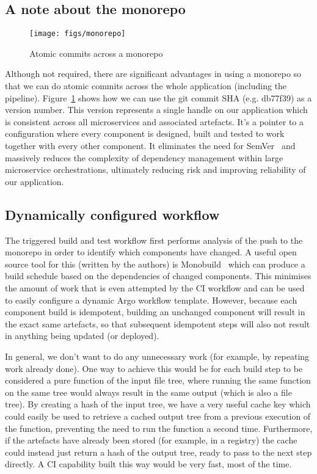 \documentclass[reprint,amsmath,amssymb,aps]{revtex4-1}
\begin{document}
\subsection{\label{sec:monorepo}A note about the monorepo}

\begin{figure}[b]
	\texttt{[image: figs/monorepo]}
	\caption{Atomic commits across a monorepo}
	\label{fig:monorepo}
\end{figure}

Although not required, there are significant advantages in using a monorepo so that we can do atomic commits across the whole application (including the pipeline). Figure~\ref{fig:monorepo} shows how we can use the git commit SHA (e.g. db77f39) as a version number. This version represents a single handle on our application which is consistent across all microservices and associated artefacts. It's a pointer to a configuration where every component is designed, built and tested to work together with every other component. It eliminates the need for SemVer~\cite{Semantic13:online} and massively reduces the complexity of dependency management within large microservice orchestrations, ultimately reducing risk and improving reliability of our application.
\subsection{\label{sec:dynamicworkflow}Dynamically configured workflow}

The triggered build and test workflow first performs analysis of the push to the monorepo in order to identify which components have changed. A useful open source tool for this (written by the authors) is Monobuild~\cite{charypar24:online} which can produce a build schedule based on the dependencies of changed components. This minimises the amount of work that is even attempted by the CI workflow and can be used to easily configure a dynamic Argo workflow template. However, because each component build is idempotent, building an unchanged component will result in the exact same artefacts, so that subsequent idempotent steps will also not result in anything being updated (or deployed).

In general, we don't want to do any unnecessary work (for example, by repeating work already done).  One way to achieve this would be for each build step to be considered a pure function of the input file tree, where running the same function on the same tree would always result in the same output (which is also a file tree). By creating a hash of the input tree, we have a very useful cache key which could easily be used to retrieve a cached output tree from a previous execution of the function, preventing the need to run the function a second time. Furthermore, if the artefacts have already been stored (for example, in a registry) the cache could instead just return a hash of the output tree, ready to pass to the next step directly. A CI capability built this way would be very fast, most of the time.
\end{document}
